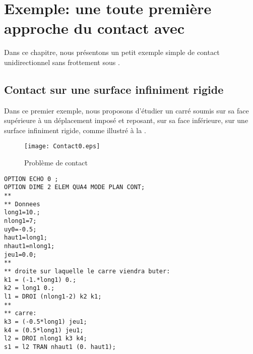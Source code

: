 \section{Exemple: une toute première approche du contact avec \castem}

Dans ce chapitre, nous présentons un petit exemple simple de contact unidirectionnel sans frottement sous \castem.

\medskip
\subsection{Contact sur une surface infiniment rigide}

Dans ce premier exemple, nous proposons d'étudier un carré soumis sur sa face supérieure à un déplacement imposé et reposant, sur sa face inférieure, sur une surface infiniment rigide, comme illustré à la .
\begin{figure}[ht]
  \center
  \texttt{[image: Contact0.eps]}
  \caption{\label{Fig-Cont0} Problème de contact}
\end{figure}
\lstset{language=castem}
\begin{multicols}{2}
\begin{lstlisting}
OPTION ECHO 0 ;
OPTION DIME 2 ELEM QUA4 MODE PLAN CONT;
**
** Donnees
long1=10.;
nlong1=7;
uy0=-0.5;
haut1=long1;
nhaut1=nlong1;
jeu1=0.0;
**
** droite sur laquelle le carre viendra buter:
k1 = (-1.*long1) 0.;
k2 = long1 0.;
l1 = DROI (nlong1-2) k2 k1;
**
** carre:
k3 = (-0.5*long1) jeu1;
k4 = (0.5*long1) jeu1;
l2 = DROI nlong1 k3 k4;
s1 = l2 TRAN nhaut1 (0. haut1);
\end{lstlisting}
\end{multicols}

